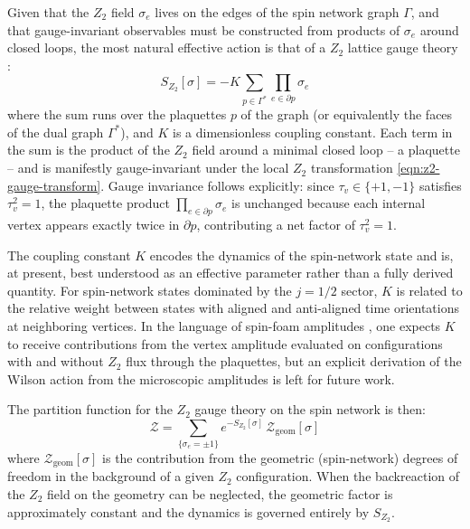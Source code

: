 \documentclass[preprint]{SciPost}
\newcommand{\mc}[1]{\mathcal{#1}}
\theoremstyle{plain} %
\begin{document}
Given that the $ Z_2 $ field $ \sigma_e $ lives on the edges of the spin network graph $ \Gamma $, and that gauge-invariant observables must be constructed from products of $ \sigma_e $ around closed loops, the most natural effective action is that of a $ Z_2 $ lattice gauge theory \cite{Wegner1971Duality,Kogut1979An-introduction}:
\begin{equation}\label{eqn:z2-gauge-action}
	S_{Z_2}[\sigma] = -K \sum_{p \in \Gamma^*} \prod_{e \in \partial p} \sigma_e
\end{equation}
where the sum runs over the plaquettes $ p $ of the graph (or equivalently the faces of the dual graph $ \Gamma^* $), and $ K $ is a dimensionless coupling constant. Each term in the sum is the product of the $ Z_2 $ field around a minimal closed loop -- a plaquette -- and is manifestly gauge-invariant under the local $ Z_2 $ transformation \eqref{eqn:z2-gauge-transform}. Gauge invariance follows explicitly: since $ \tau_v \in \{+1,-1\} $ satisfies $ \tau_v^2 = 1 $, the plaquette product $ \prod_{e \in \partial p} \sigma_e $ is unchanged because each internal vertex appears exactly twice in $ \partial p $, contributing a net factor of $ \tau_v^2 = 1 $.

The coupling constant $ K $ encodes the dynamics of the spin-network state and is, at present, best understood as an effective parameter rather than a fully derived quantity. For spin-network states dominated by the $ j = 1/2 $ sector, $ K $ is related to the relative weight between states with aligned and anti-aligned time orientations at neighboring vertices. In the language of spin-foam amplitudes \cite{Perez2013The-Spin-Foam,Dona2020Numerical,Dona2022Asymptotics}, one expects $ K $ to receive contributions from the vertex amplitude evaluated on configurations with and without $ Z_2 $ flux through the plaquettes, but an explicit derivation of the Wilson action from the microscopic amplitudes is left for future work.

The partition function for the $ Z_2 $ gauge theory on the spin network is then:
\begin{equation}\label{eqn:z2-partition-function}
	\mc{Z} = \sum_{\{\sigma_e = \pm 1\}} e^{-S_{Z_2}[\sigma]} \, \mc{Z}_{\text{geom}}[\sigma]
\end{equation}
where $ \mc{Z}_{\text{geom}}[\sigma] $ is the contribution from the geometric (spin-network) degrees of freedom in the background of a given $ Z_2 $ configuration. When the backreaction of the $ Z_2 $ field on the geometry can be neglected, the geometric factor is approximately constant and the dynamics is governed entirely by $ S_{Z_2} $.
\end{document}
